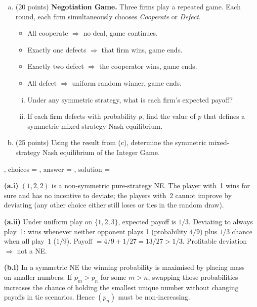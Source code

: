 {{\begin{enumerate}[(a)]
      \item (20 points) \textbf{Negotiation Game.} Three firms play a
            repeated game. Each round, each firm simultaneously chooses
            \emph{Cooperate} or \emph{Defect}.
            \begin{itemize}
              \item All cooperate $\Rightarrow$ no deal, game continues.
              \item Exactly one defects $\Rightarrow$ that firm wins, game ends.
              \item Exactly two defect $\Rightarrow$ the cooperator wins, game ends.
              \item All defect $\Rightarrow$ uniform random winner, game ends.
            \end{itemize}
            \begin{enumerate}[(i)]
              \item Under any symmetric strategy, what is each firm's
                    expected payoff?
              \item If each firm defects with probability $p$, find the
                    value of $p$ that defines a symmetric mixed-strategy
                    Nash equilibrium.
            \end{enumerate}

      \item (25 points) Using the result from (c), determine the symmetric
            mixed-strategy Nash equilibrium of the Integer Game.
    \end{enumerate}
  },
  choices   = {},
  answer    = {},
  solution  = {%
    \textbf{(a.i)} $(1, 2, 2)$ is a non-symmetric pure-strategy NE. The
    player with~1 wins for sure and has no incentive to deviate; the
    players with~2 cannot improve by deviating (any other choice either
    still loses or ties in the random draw).

    \textbf{(a.ii)} Under uniform play on $\{1,2,3\}$, expected payoff is
    $1/3$. Deviating to always play~1: wins whenever neither opponent plays
    1 (probability $4/9$) plus $1/3$ chance when all play~1 ($1/9$).
    Payoff $= 4/9 + 1/27 = 13/27 > 1/3$. Profitable deviation $\Rightarrow$
    not a NE.

    \textbf{(b.i)} In a symmetric NE the winning probability is maximised
    by placing mass on smaller numbers. If $p_m > p_n$ for some $m > n$,
    swapping those probabilities increases the chance of holding the
    smallest unique number without changing payoffs in tie scenarios.
    Hence $(p_n)$ must be non-increasing.

}}

